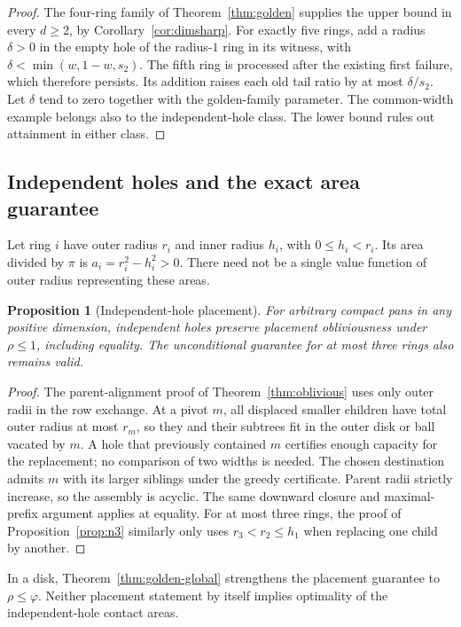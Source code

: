 \documentclass[11pt]{article}
\newtheorem{proposition}[theorem]{Proposition}
\theoremstyle{definition}
\begin{document}
\begin{proof}
The four-ring family of Theorem~\ref{thm:golden} supplies the upper
bound in every $d\ge2$, by Corollary~\ref{cor:dimsharp}. For exactly
five rings, add a radius $\delta>0$ in the empty hole of the radius-$1$
ring in its witness, with $\delta<\min(w,1-w,s_2)$. The fifth ring
is processed after the existing first failure, which therefore persists.
Its addition raises each old tail ratio by at most $\delta/s_2$.
Let $\delta$ tend to zero together with the golden-family parameter.
The common-width example belongs also to the independent-hole class.
The lower bound rules out attainment in either class.
\end{proof}

\subsection{Independent holes and the exact area guarantee}\label{sec:variablewidth}

Let ring $i$ have outer radius $r_i$ and inner radius $h_i$, with
$0\le h_i<r_i$. Its area divided by $\pi$ is
$a_i=r_i^2-h_i^2>0$. There need not be a single value function of
outer radius representing these areas.

\begin{proposition}[Independent-hole placement]\label{prop:independent}
For arbitrary compact pans in any positive dimension, independent holes
preserve placement obliviousness under $\rho\le1$, including equality.
The unconditional guarantee for at most three rings also remains valid.
\end{proposition}
\begin{proof}
The parent-alignment proof of Theorem~\ref{thm:oblivious} uses only
outer radii in the row exchange. At a pivot $m$, all displaced smaller
children have total outer radius at most $r_m$, so they and their
subtrees fit in the outer disk or ball vacated by $m$. A hole that
previously contained $m$ certifies enough capacity for the replacement;
no comparison of two widths is needed. The chosen destination admits
$m$ with its larger siblings under the greedy certificate. Parent radii
strictly increase, so the assembly is acyclic. The same downward closure
and maximal-prefix argument applies at equality. For at most three
rings, the proof of Proposition~\ref{prop:n3} similarly only uses
$r_3<r_2\le h_1$ when replacing one child by another.
\end{proof}

In a disk, Theorem~\ref{thm:golden-global} strengthens the placement
guarantee to $\rho\le\varphi$. Neither placement statement by itself
implies optimality of the independent-hole contact areas.
\end{document}
